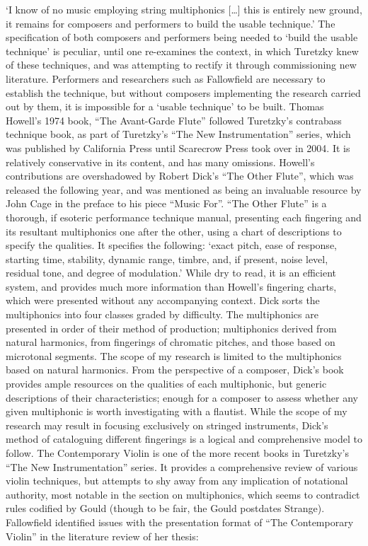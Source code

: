 ‘I know of no music employing string multiphonics […] this is entirely new ground, it remains for composers and performers to build the usable technique.’ 
The specification of both composers and performers being needed to ‘build the usable technique’ is peculiar, until one re-examines the context, in which Turetzky knew of these techniques, and was attempting to rectify it through commissioning new literature. Performers and researchers such as Fallowfield are necessary to establish the technique, but without composers implementing the research carried out by them, it is impossible for a ‘usable technique’ to be built.
Thomas Howell’s 1974 book, “The Avant-Garde Flute” followed Turetzky’s contrabass technique book, as part of Turetzky’s “The New Instrumentation” series, which was published by California Press until Scarecrow Press took over in 2004.  It is relatively conservative in its content, and has many omissions. Howell’s contributions are overshadowed by Robert Dick’s “The Other Flute”, which was released the following year, and was mentioned as being an invaluable resource by John Cage in the preface to his piece “Music For”.  “The Other Flute” is a thorough, if esoteric performance technique manual, presenting each fingering and its resultant multiphonics one after the other, using a chart of descriptions to specify the qualities. It specifies the following: ‘exact pitch, ease of response, starting time, stability, dynamic range, timbre, and, if present, noise level, residual tone, and degree of modulation.’  While dry to read, it is an efficient system, and provides much more information than Howell’s fingering charts, which were presented without any accompanying context. Dick sorts the multiphonics into four classes graded by difficulty. The multiphonics are presented in order of their method of production; multiphonics derived from natural harmonics, from fingerings of chromatic pitches, and those based on microtonal segments. The scope of my research is limited to the multiphonics based on natural harmonics. From the perspective of a composer, Dick’s book provides ample resources on the qualities of each multiphonic, but generic descriptions of their characteristics; enough for a composer to assess whether any given multiphonic is worth investigating with a flautist. While the scope of my research may result in focusing exclusively on stringed instruments, Dick’s method of cataloguing different fingerings is a logical and comprehensive model to follow.
The Contemporary Violin is one of the more recent books in Turetzky’s “The New Instrumentation” series. It provides a comprehensive review of various violin techniques, but attempts to shy away from any implication of notational authority, most notable in the section on multiphonics, which seems to contradict rules codified by Gould (though to be fair, the Gould postdates Strange).  Fallowfield identified issues with the presentation format of “The Contemporary Violin” in the literature review of her thesis: 
